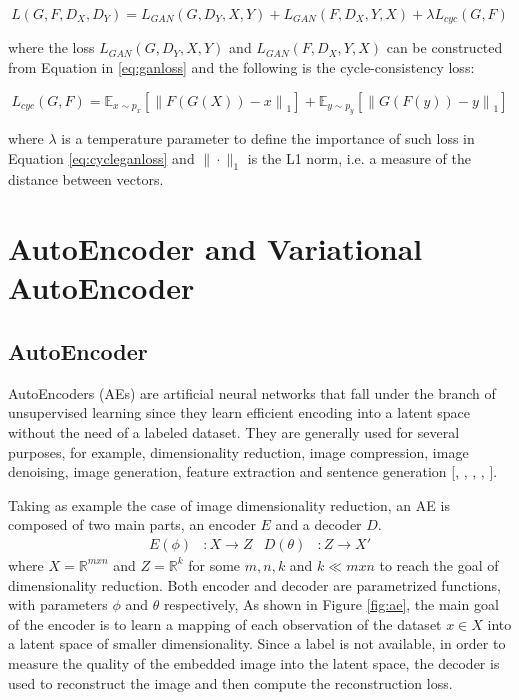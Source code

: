 \begin{equation}
  \label{eq:cycleganloss}
  L(G,F,D_{X}, D_{Y}) = L_{GAN}(G, D_{Y},X,Y) + L_{GAN}(F, D_{X},Y,X) + \lambda L_{cyc}(G,F)
\end{equation}

where the loss $L_{GAN}(G, D_{Y},X,Y)$ and $L_{GAN}(F, D_{X},Y,X)$ can be constructed from Equation in \ref{eq:ganloss}
and the following is the cycle-consistency loss:

\begin{equation}
  L_{cyc}(G,F) =  \mathbb{E}_{x\sim p_{x}}[\left \| F(G(X))-x \right \|_1] + \mathbb{E}_{y\sim p_{y}}[\left \| G(F(y))-y \right \|_1]
\end{equation}

where $\lambda$ is a temperature parameter to define the importance of such loss in Equation \ref{eq:cycleganloss} and $\| \cdot \|_1$ is the L1 norm, i.e. a measure of the distance between vectors.

\section{AutoEncoder and Variational AutoEncoder}

\subsection{AutoEncoder}
AutoEncoders (AEs) are artificial neural networks that fall under the branch of unsupervised learning since they learn efficient encoding into a latent space without the need of a labeled dataset. They are generally used for several purposes, for example, dimensionality reduction, image compression, image denoising, image generation, feature extraction and sentence generation [\citet{doi:10.1126/science.1127647}, \citet{8456308}, \citet{7836672}, \citet{7926714}, \citet{8852155}]. 

Taking as example the case of image dimensionality reduction, an AE is composed of two main parts, an encoder $E$ and a decoder $D$. 
\begin{align}
  E(\phi) &:  X \rightarrow Z & D(\theta) &:  Z \rightarrow X'
\end{align}
where $X = \mathbb{R}^{mxn}$ and $Z = \mathbb{R}^{k }$ for some $m,n,k$ and $k\ll mxn$ to reach the goal of dimensionality reduction. Both encoder and decoder are parametrized functions, with parameters $\phi$ and $\theta$ respectively,
As shown in Figure \ref{fig:ae}, the main goal of the encoder is to learn a mapping of each observation of the dataset $x \in X$ into a latent space of smaller dimensionality.  Since a label is not available, in order to measure the quality of the embedded image into the latent space, the decoder is used to reconstruct the image and then compute the reconstruction loss.


